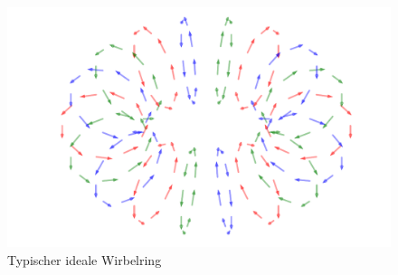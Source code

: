 \begin{figure}
\centering
\includegraphics[width=\textwidth]{papers/wirbelringe/fig/wirbelring_RGB.pdf}
\caption{Typischer ideale Wirbelring \label{buch:papers:Wirbelringe:fig:generell}}
\end{figure}